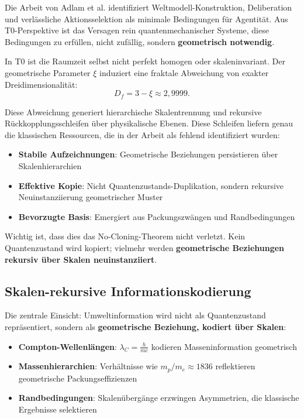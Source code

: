 	Die Arbeit von Adlam et al. identifiziert Weltmodell-Konstruktion, Deliberation und verlässliche Aktionsselektion als minimale Bedingungen für Agentität. Aus T0-Perspektive ist das Versagen rein quantenmechanischer Systeme, diese Bedingungen zu erfüllen, nicht zufällig, sondern \textbf{geometrisch notwendig}.
	
	In T0 ist die Raumzeit selbst nicht perfekt homogen oder skaleninvariant. Der geometrische Parameter $\xi$ induziert eine fraktale Abweichung von exakter Dreidimensionalität:
	\[
	D_f = 3 - \xi \approx 2{,}9999.
	\]
	
	Diese Abweichung generiert hierarchische Skalentrennung und rekursive Rückkopplungsschleifen über physikalische Ebenen. Diese Schleifen liefern genau die klassischen Ressourcen, die in der Arbeit als fehlend identifiziert wurden:
	
	\begin{itemize}
		\item \textbf{Stabile Aufzeichnungen}: Geometrische Beziehungen persistieren über Skalenhierarchien
		\item \textbf{Effektive Kopie}: Nicht Quantenzustands-Duplikation, sondern rekursive Neuinstanziierung geometrischer Muster
		\item \textbf{Bevorzugte Basis}: Emergiert aus Packungszwängen und Randbedingungen
	\end{itemize}
	
	Wichtig ist, dass dies das No-Cloning-Theorem nicht verletzt. Kein Quantenzustand wird kopiert; vielmehr werden \textbf{geometrische Beziehungen rekursiv über Skalen neuinstanziiert}.
	
	\subsection{Skalen-rekursive Informationskodierung}
	
	Die zentrale Einsicht: Umweltinformation wird nicht als Quantenzustand repräsentiert, sondern als \textbf{geometrische Beziehung, kodiert über Skalen}:
	
	\begin{itemize}
		\item \textbf{Compton-Wellenlängen}: $\lambda_C = \frac{h}{mc}$ kodieren Masseninformation geometrisch
		\item \textbf{Massenhierarchien}: Verhältnisse wie $m_p/m_e \approx 1836$ reflektieren geometrische Packungseffizienzen
		\item \textbf{Randbedingungen}: Skalenübergänge erzwingen Asymmetrien, die klassische Ergebnisse selektieren
	\end{itemize}
	
